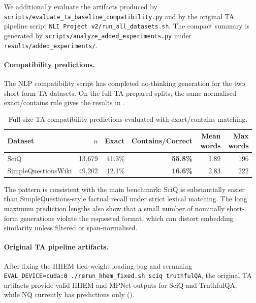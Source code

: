 \documentclass{article}
\begin{document}
We additionally evaluate the artifacts produced by
\texttt{scripts/evaluate\_ta\_baseline\_compatibility.py} and by the original TA
pipeline script \texttt{NLI Project v2/run\_all\_datasets.sh}.  The compact
summary is generated by \texttt{scripts/analyze\_added\_experiments.py} under
\texttt{results/added\_experiments/}.

\paragraph{Compatibility predictions.}
The NLP compatibility script has completed no-thinking generation for the two
short-form TA datasets.  On the full TA-prepared splits, the same normalised
exact/contains rule gives the results in .

\begin{table}[t]
\centering
\caption{Full-size TA compatibility predictions evaluated with exact/contains matching.}
\label{tab:ta-compat}
\setlength{\tabcolsep}{5pt}
\begin{tabular}{lrrrrr}
\toprule
\textbf{Dataset} & $n$ & \textbf{Exact} & \textbf{Contains/Correct}
  & \textbf{Mean words} & \textbf{Max words} \\
\midrule
SciQ                & 13,679 & 41.3\% & \textbf{55.8\%} & 1.89 & 196 \\
SimpleQuestionsWiki & 49,202 & 12.1\% & \textbf{16.6\%} & 2.83 & 222 \\
\bottomrule
\end{tabular}
\end{table}

The pattern is consistent with the main benchmark: SciQ is substantially easier
than SimpleQuestions-style factual recall under strict lexical matching.  The long
maximum prediction lengths also show that a small number of nominally short-form
generations violate the requested format, which can distort embedding similarity
unless filtered or span-normalised.

\paragraph{Original TA pipeline artifacts.}
After fixing the HHEM tied-weight loading bug and rerunning
\texttt{EVAL\_DEVICE=cuda:0 ./rerun\_hhem\_fixed.sh sciq truthfulQA}, the
original TA artifacts provide valid HHEM and MPNet outputs for SciQ and
TruthfulQA, while NQ currently has predictions only ().
\end{document}
